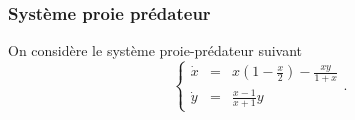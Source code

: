 \subsubsection{Système proie prédateur} 

On considère le système proie-prédateur suivant
\begin{equation} \label{eq:L3bioProiePredateur}
\left\{\begin{array}{rcl}
        \dot x & = & \displaystyle{x \left(1 - \frac{x}2\right) - \frac{xy}{1+x}} \\
        \dot y & = & \displaystyle{\frac{x-1}{x+1} y}
       \end{array}\right..
\end{equation}

